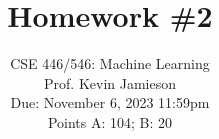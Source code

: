 \documentclass{article}
\begin{document}
\setcounter{aprob}{0}
\title{Homework \#2}
\author{
    \normalsize{CSE 446/546: Machine Learning}\\
    \normalsize{Prof. Kevin Jamieson}\\
    \normalsize{Due: November 6, 2023 11:59pm}\\
    \normalsize{Points A: 104; B: 20}
}
\date{{}}
\maketitle
\begin{sloppypar}


\end{sloppypar}
\end{document}
